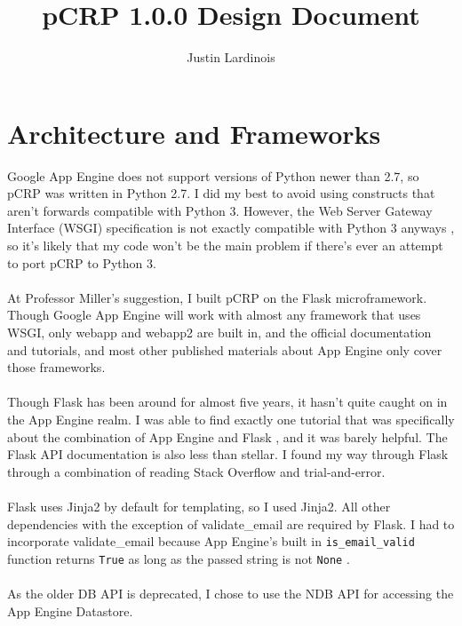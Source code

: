 \documentclass[12pt]{article}
\title{pCRP 1.0.0 Design Document}
\author{Justin Lardinois}
\date{}
\begin{document}
\maketitle

\section{Architecture and Frameworks}
	Google App Engine does not support versions of Python newer than 2.7, so
	pCRP was written in Python 2.7. I did my best to avoid using constructs
	that aren't forwards compatible with Python 3. However, the Web Server
	Gateway Interface (WSGI) specification is not exactly compatible with
	Python 3 anyways \cite{python3}, so it's likely that my code won't be
	the main problem if there's ever an attempt to port pCRP to Python 3.
	\\\\
	At Professor Miller's suggestion, I built pCRP on the Flask
	microframework. Though Google App Engine will work with almost any
	framework that uses WSGI, only webapp and webapp2 are built in, and
	the official documentation and tutorials, and most other published
	materials about App Engine only cover those frameworks.
	\\\\
	Though Flask has been around for almost five years, it hasn't quite
	caught on in the App Engine realm. I was able to find exactly one
	tutorial that was specifically about the combination of App Engine
	and Flask \cite{souza}, and it was barely helpful. The Flask API
	documentation \cite{flask} is also less than stellar. I found my
	way through Flask through a combination of reading Stack Overflow
	and trial-and-error.
	\\\\
	Flask uses Jinja2 by default for templating, so I used Jinja2. All
	other dependencies with the exception of validate{\_}email are required
	by Flask. I had to incorporate validate{\_}email because App Engine's
	built in \texttt{is{\_}email{\_}valid} function returns \texttt{True} as
	long as the passed string is not \texttt{None} \cite{email}.
	\\\\
	As the older DB API is deprecated, I chose to use the NDB API for
	accessing the App Engine Datastore.




\end{document}
